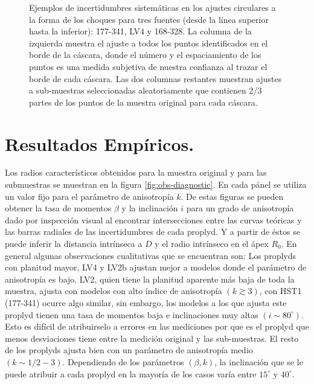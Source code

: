 \begin{figure}
\begin{tabular}{@{}c@{}c@{}c@{}}
\end{tabular}
\caption{Ejemplos de incertidumbres sistemáticas en los ajustes circulares a la forma de los choques para tres fuentes (desde la línea superior hasta la inferior): 177-341, LV4 y 168-328. La columna de la izquierda muestra el ajuste a todos los puntos identificados en el borde de la cáscara, donde el número y el espaciamiento de los puntos es una medida subjetiva de nuestra confianza al trazar el borde de cada cáscara. Las dos columnas restantes muestran ajustes a sub-muestras seleccionadas aleatoriamente que contienen 2/3 partes de los puntos de la muestra original para cada cáscara.}
\label{fig:char-radii-obs}
\end{figure}

\section{Resultados Empíricos.}

Los radios característicos obtenidos para la muestra original y para las submuestras se muestran en la figura \ref{fig:obs-diagnostic}. En cada pánel se utiliza un valor fijo para el parámetro de anisotropía $k$. De estas figuras se pueden obtener la tasa de momentos $\beta$ y la inclinación $i$ para un grado de anisotropía dado por inspección visual al encontrar intersecciones entre las curvas teóricas y las barras radiales de las incertidumbres de cada proplyd. Y a partir de éstos se puede inferir la distancia intrínseca a \thC{} $D$ y el radio intrínseco en el ápex $R_0$. En general algunas observaciones cualitativas que se encuentran son: Los proplyds con planitud mayor, LV4 y LV2b ajustan mejor a modelos donde el parámetro de anisotropía es bajo. LV2, quien tiene la planitud aparente más baja de toda la muestra, ajusta con modelos con alto índice de anisotropía $(k \gtrsim 3)$, con HST1 (177-341) ocurre algo similar, sin embargo, los modelos a los que ajusta este proplyd tienen una tasa de momentos baja e inclinaciones muy altas $(i \sim 80^{\circ})$. Esto es difícil de atribuirselo a errores en las mediciones por que es el proplyd que menos desviaciones tiene entre la medición original y las sub-muestras. El resto de los proplyds ajusta bien con un parámetro de anisotropía medio $(k\sim 1/2 - 3)$. Dependiendo de los parámetros $(\beta, k)$, la inclinación que se le puede atribuir a cada proplyd en la mayoría de los casos varía entre $15^\circ$ y $40^\circ$. 

